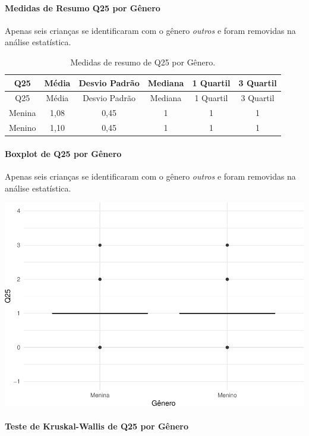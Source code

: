 \documentclass[]{article}
\let\oldparagraph\paragraph
\renewcommand{\paragraph}[1]{\oldparagraph{#1}\mbox{}}
\begin{document}
\hypertarget{medidas-de-resumo-q25-por-guxeanero}{%
\paragraph{Medidas de Resumo Q25 por Gênero}\label{medidas-de-resumo-q25-por-guxeanero}}

Apenas seis crianças se identificaram com o gênero \emph{outros} e foram removidas na análise estatística.

\begin{longtable}[]{@{}cccccc@{}}
\caption{\label{tab:unnamed-chunk-676}Medidas de resumo de Q25 por Gênero.}\tabularnewline
\toprule
Q25 & Média & Desvio Padrão & Mediana & 1 Quartil & 3 Quartil\tabularnewline
\midrule
\endfirsthead
\toprule
Q25 & Média & Desvio Padrão & Mediana & 1 Quartil & 3 Quartil\tabularnewline
\midrule
\endhead
Menina & 1,08 & 0,45 & 1 & 1 & 1\tabularnewline
Menino & 1,10 & 0,45 & 1 & 1 & 1\tabularnewline
\bottomrule
\end{longtable}

\hypertarget{boxplot-de-q25-por-guxeanero}{%
\paragraph{Boxplot de Q25 por Gênero}\label{boxplot-de-q25-por-guxeanero}}

Apenas seis crianças se identificaram com o gênero \emph{outros} e foram removidas na análise estatística.

\begin{center}\includegraphics[width=0.75\linewidth]{relatorio_covid19_files/figure-latex/unnamed-chunk-677-1} \end{center}

\hypertarget{teste-de-kruskal-wallis-de-q25-por-guxeanero}{%
\paragraph{Teste de Kruskal-Wallis de Q25 por Gênero}\label{teste-de-kruskal-wallis-de-q25-por-guxeanero}}
\end{document}

